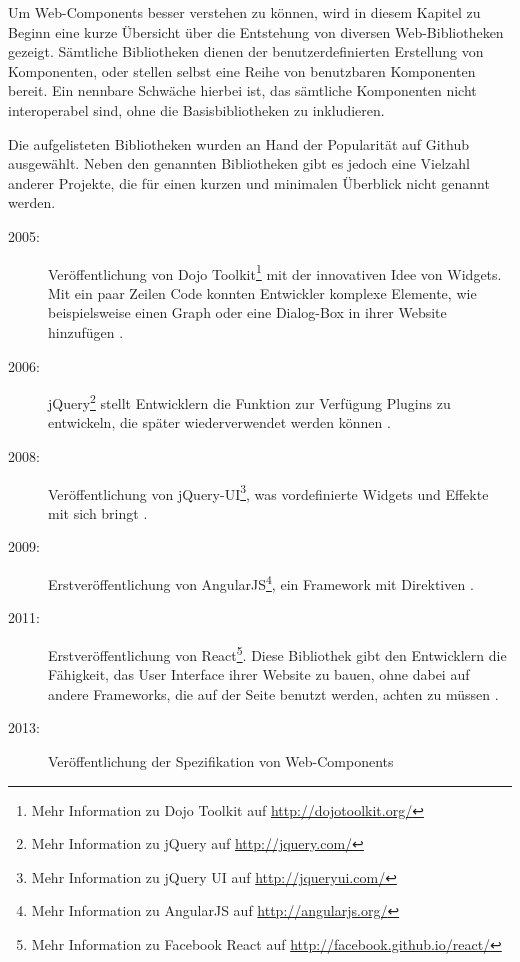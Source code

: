 Um Web-Components besser verstehen zu können, wird in diesem Kapitel zu Beginn eine kurze Übersicht über die Entstehung von diversen Web-Bibliotheken gezeigt. Sämtliche Bibliotheken dienen der benutzerdefinierten Erstellung von Komponenten, oder stellen selbst eine Reihe von benutzbaren Komponenten bereit. Ein nennbare Schwäche hierbei ist, das sämtliche Komponenten nicht interoperabel sind, ohne die Basisbibliotheken zu inkludieren.

Die aufgelisteten Bibliotheken wurden an Hand der Popularität auf Github ausgewählt. Neben den genannten Bibliotheken gibt es jedoch eine Vielzahl anderer Projekte, die für einen kurzen und minimalen Überblick nicht genannt werden.

\begin{description}
\item[2005:] Veröffentlichung von Dojo Toolkit\footnote{Mehr Information zu Dojo Toolkit auf \href{http://dojotoolkit.org/}{http://dojotoolkit.org/}} mit der innovativen Idee von Widgets. Mit ein paar Zeilen Code konnten Entwickler komplexe Elemente, wie beispielsweise einen Graph oder eine Dialog-Box in ihrer Website hinzufügen \citereset \autocite[siehe][]{Dojo.2005}.
\item[2006:] jQuery\footnote{Mehr Information zu jQuery auf \href{http://jquery.com/}{http://jquery.com/}} stellt Entwicklern die Funktion zur Verfügung Plugins zu entwickeln, die später wiederverwendet werden können \citereset \autocite[siehe][]{jQuery}.
\item[2008:] Veröffentlichung von jQuery-UI\footnote{Mehr Information zu jQuery UI auf \href{http://jqueryui.com/}{http://jqueryui.com/}}, was vordefinierte Widgets und Effekte mit sich bringt \citereset \autocite[siehe][]{jQueryUI}.
\item[2009:] Erstveröffentlichung von AngularJS\footnote{Mehr Information zu AngularJS auf \href{http://angularjs.org/}{http://angularjs.org/}}, ein Framework mit Direktiven \citereset \autocite[siehe][]{AngularJS}.
\item[2011:] Erstveröffentlichung von React\footnote{Mehr Information zu Facebook React auf \href{http://facebook.github.io/react/}{http://facebook.github.io/react/}}. Diese Bibliothek gibt den Entwicklern die Fähigkeit, das User Interface ihrer Website zu bauen, ohne dabei auf andere Frameworks, die auf der Seite benutzt werden, achten zu müssen \citereset \autocite[siehe][]{Facebook}.
\item[2013:] Veröffentlichung der Spezifikation von Web-Components \citereset \autocite[siehe][]{CooneyGlazkov.2013}
\end{description}

